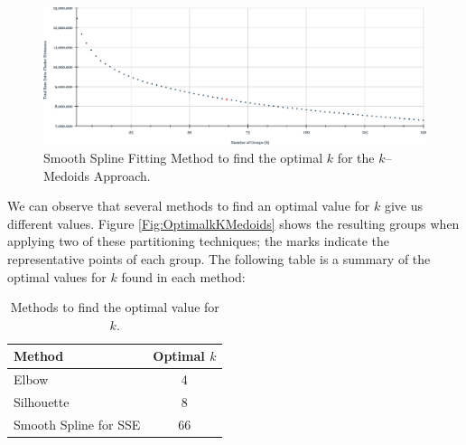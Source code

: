 \begin{figure}[h]
	\centering
	\includegraphics[scale=0.5]{../Figures/SmoothSpline-kMedoids}
	\caption{Smooth Spline Fitting Method to find the optimal $k$ for the $k$--Medoids Approach.}
	\label{Fig:SmoothSpline-kMedoids}
\end{figure}

We can observe that several methods to find an optimal value for $k$ give us different values. Figure \ref{Fig:OptimalkKMedoids} shows the resulting groups when applying two of these partitioning techniques; the marks indicate the representative points of each group. %
The following table is a summary of the optimal values for $k$ found in each method:
\begin{table}[h]
	\centering
	\tiny
	\begin{tabular}{|l|c|}
		\hline
		Method & Optimal $k$ \\ \hline
		Elbow  & 4	\\
		Silhouette & 8	\\
		Smooth Spline for SSE & 66\\ \hline
	\end{tabular}
\caption{Methods to find the optimal value for $k$.}
\label{Table:ValidationIndex}
\end{table}
		
